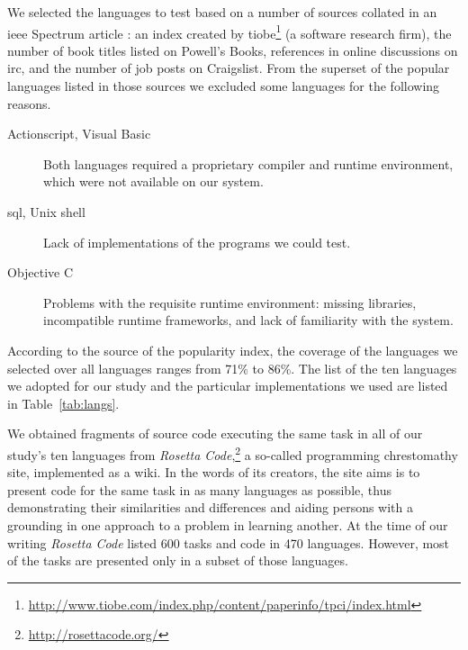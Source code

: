 \documentclass[10pt]{sigplanconf}
\begin{document}
We selected the languages to test based on a number of sources
collated in an {\sc ieee} Spectrum article \cite{Kin11}:
an index created by
{\sc tiobe}\footnote{\url{http://www.tiobe.com/index.php/content/paperinfo/tpci/index.html}} (a software research firm),
the number of book titles listed on Powell's Books,
references in online discussions on {\sc irc}, and
the number of job posts on Craigslist.
From the superset of the popular languages listed in those
sources we excluded some languages for the following reasons.
\begin{description}
\item[Actionscript, Visual Basic] Both languages
required a proprietary compiler and runtime environment,
which were not available on our system.
\item[{\sc sql}, Unix shell] Lack of implementations of the programs
we could test.
\item[Objective C] Problems with the requisite runtime environment:
missing libraries, incompatible runtime frameworks,
and lack of familiarity with the system.
\end{description}

According to the source of the popularity index,
the coverage of the languages we selected over all languages
ranges from 71\% to 86\%.
The list of the ten languages we adopted for our study and the
particular implementations we used are listed in
Table~\ref{tab:langs}.

We obtained fragments of source code executing the same task in all of
our study's ten languages from
{\em Rosetta Code},\footnote{\url{http://rosettacode.org/}}
a so-called programming chrestomathy site,
implemented as a wiki.
In the words of its creators,
the site aims is to present code for the same task in as many languages as possible,
thus demonstrating their similarities and differences and
aiding persons with a grounding in one approach to a problem in learning another.
At the time of our writing {\em Rosetta Code}
listed 600 tasks and code in 470 languages.
However, most of the tasks are presented only in a subset of those languages.
\end{document}
